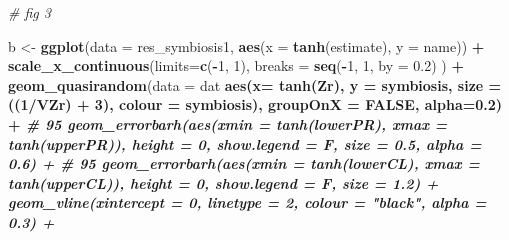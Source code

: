 \documentclass[
]{article}
\newenvironment{Shaded}{\begin{snugshade}}{\end{snugshade}}
\newcommand{\CommentTok}[1]{\textcolor[rgb]{0.56,0.35,0.01}{\textit{#1}}}
\newcommand{\DataTypeTok}[1]{\textcolor[rgb]{0.13,0.29,0.53}{#1}}
\newcommand{\DecValTok}[1]{\textcolor[rgb]{0.00,0.00,0.81}{#1}}
\newcommand{\FloatTok}[1]{\textcolor[rgb]{0.00,0.00,0.81}{#1}}
\newcommand{\KeywordTok}[1]{\textcolor[rgb]{0.13,0.29,0.53}{\textbf{#1}}}
\newcommand{\NormalTok}[1]{#1}
\newcommand{\OperatorTok}[1]{\textcolor[rgb]{0.81,0.36,0.00}{\textbf{#1}}}
\newcommand{\OtherTok}[1]{\textcolor[rgb]{0.56,0.35,0.01}{#1}}
\newcommand{\StringTok}[1]{\textcolor[rgb]{0.31,0.60,0.02}{#1}}
\begin{document}
\begin{Shaded}
\begin{Highlighting}[]
\CommentTok{# fig 3}

\NormalTok{b <-}\StringTok{ }\KeywordTok{ggplot}\NormalTok{(}\DataTypeTok{data =}\NormalTok{ res_symbiosis1, }\KeywordTok{aes}\NormalTok{(}\DataTypeTok{x =} \KeywordTok{tanh}\NormalTok{(estimate), }\DataTypeTok{y =}\NormalTok{ name)) }\OperatorTok{+}
\StringTok{  }\KeywordTok{scale_x_continuous}\NormalTok{(}\DataTypeTok{limits=}\KeywordTok{c}\NormalTok{(}\OperatorTok{-}\DecValTok{1}\NormalTok{, }\DecValTok{1}\NormalTok{), }\DataTypeTok{breaks =} \KeywordTok{seq}\NormalTok{(}\OperatorTok{-}\DecValTok{1}\NormalTok{, }\DecValTok{1}\NormalTok{, }\DataTypeTok{by =} \FloatTok{0.2}\NormalTok{) ) }\OperatorTok{+}
\StringTok{  }\KeywordTok{geom_quasirandom}\NormalTok{(}\DataTypeTok{data =}\NormalTok{ dat }\OperatorTok{%
                   \KeywordTok{aes}\NormalTok{(}\DataTypeTok{x=} \KeywordTok{tanh}\NormalTok{(Zr), }\DataTypeTok{y =}\NormalTok{ symbiosis, }\DataTypeTok{size =}\NormalTok{ ((}\DecValTok{1}\OperatorTok{/}\NormalTok{VZr) }\OperatorTok{+}\StringTok{ }\DecValTok{3}\NormalTok{), }\DataTypeTok{colour =}\NormalTok{ symbiosis), }\DataTypeTok{groupOnX =} \OtherTok{FALSE}\NormalTok{, }\DataTypeTok{alpha=}\FloatTok{0.2}\NormalTok{) }\OperatorTok{+}\StringTok{ }
\StringTok{  }\CommentTok{# 95 %
\StringTok{  }\KeywordTok{geom_errorbarh}\NormalTok{(}\KeywordTok{aes}\NormalTok{(}\DataTypeTok{xmin =} \KeywordTok{tanh}\NormalTok{(lowerPR), }\DataTypeTok{xmax =} \KeywordTok{tanh}\NormalTok{(upperPR)),  }\DataTypeTok{height =} \DecValTok{0}\NormalTok{, }\DataTypeTok{show.legend =}\NormalTok{ F, }\DataTypeTok{size =} \FloatTok{0.5}\NormalTok{, }\DataTypeTok{alpha =} \FloatTok{0.6}\NormalTok{) }\OperatorTok{+}
\StringTok{  }\CommentTok{# 95 %
\StringTok{  }\KeywordTok{geom_errorbarh}\NormalTok{(}\KeywordTok{aes}\NormalTok{(}\DataTypeTok{xmin =} \KeywordTok{tanh}\NormalTok{(lowerCL), }\DataTypeTok{xmax =} \KeywordTok{tanh}\NormalTok{(upperCL)),  }\DataTypeTok{height =} \DecValTok{0}\NormalTok{, }\DataTypeTok{show.legend =}\NormalTok{ F, }\DataTypeTok{size =} \FloatTok{1.2}\NormalTok{) }\OperatorTok{+}
\StringTok{  }\KeywordTok{geom_vline}\NormalTok{(}\DataTypeTok{xintercept =} \DecValTok{0}\NormalTok{, }\DataTypeTok{linetype =} \DecValTok{2}\NormalTok{, }\DataTypeTok{colour =} \StringTok{"black"}\NormalTok{, }\DataTypeTok{alpha =} \FloatTok{0.3}\NormalTok{) }\OperatorTok{+}
}}}
\end{Highlighting}
\end{Shaded}
\end{document}
